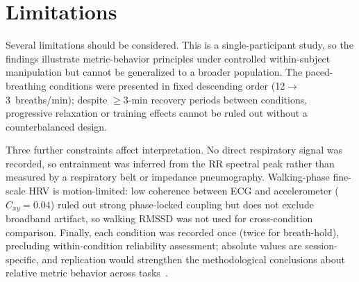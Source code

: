 \documentclass[conference]{IEEEtran}
\begin{document}
\begin{table}[!t]
\caption{HRV Metric Interpretability by Condition}
\label{tab:validity}
\centering
\footnotesize
{}
\end{table}


\section{Limitations}
\label{sec:limitations}

Several limitations should be considered. This is a single-participant
study, so the findings illustrate metric-behavior principles under
controlled within-subject manipulation but cannot be generalized
to a broader population. The paced-breathing conditions were
presented in fixed descending order (12$\to$3~breaths/min);
despite $\geq$3-min recovery periods between conditions, progressive
relaxation or training effects cannot be ruled out without a
counterbalanced design.

Three further constraints affect interpretation. No direct
respiratory signal was recorded, so entrainment was inferred from
the RR spectral peak rather than measured by a respiratory belt or
impedance pneumography. Walking-phase fine-scale HRV is
motion-limited: low coherence between ECG and accelerometer
($C_{xy} = 0.04$) ruled out strong phase-locked coupling but does
not exclude broadband artifact, so walking RMSSD was not used for
cross-condition comparison. Finally, each condition was recorded
once (twice for breath-hold), precluding within-condition
reliability assessment; absolute values are session-specific, and
replication would strengthen the methodological conclusions about
relative metric behavior across tasks~\cite{shaffer2017}.
\end{document}

